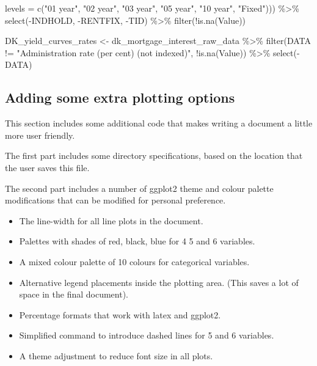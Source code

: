 \documentclass[
]{book}
\newenvironment{Shaded}{\begin{snugshade}}{\end{snugshade}}
\newcommand{\AttributeTok}[1]{\textcolor[rgb]{0.77,0.63,0.00}{#1}}
\newcommand{\FunctionTok}[1]{\textcolor[rgb]{0.00,0.00,0.00}{#1}}
\newcommand{\NormalTok}[1]{#1}
\newcommand{\OtherTok}[1]{\textcolor[rgb]{0.56,0.35,0.01}{#1}}
\newcommand{\SpecialCharTok}[1]{\textcolor[rgb]{0.00,0.00,0.00}{#1}}
\newcommand{\StringTok}[1]{\textcolor[rgb]{0.31,0.60,0.02}{#1}}
\providecommand{\tightlist}{%
  \setlength{\itemsep}{0pt}\setlength{\parskip}{0pt}}
\begin{document}
\begin{Shaded}
\begin{Highlighting}[]
                                      \AttributeTok{levels =} \FunctionTok{c}\NormalTok{(}\StringTok{"01 year"}\NormalTok{,}
                                                 \StringTok{"02 year"}\NormalTok{,}
                                                 \StringTok{"03 year"}\NormalTok{, }
                                                 \StringTok{"05 year"}\NormalTok{,}
                                                 \StringTok{"10 year"}\NormalTok{,}
                                                 \StringTok{"Fixed"}\NormalTok{))) }\SpecialCharTok{\%\textgreater{}\%}
    \FunctionTok{select}\NormalTok{(}\SpecialCharTok{{-}}\NormalTok{INDHOLD, }\SpecialCharTok{{-}}\NormalTok{RENTFIX, }\SpecialCharTok{{-}}\NormalTok{TID) }\SpecialCharTok{\%\textgreater{}\%}
    \FunctionTok{filter}\NormalTok{(}\SpecialCharTok{!}\FunctionTok{is.na}\NormalTok{(Value))}


\NormalTok{DK\_yield\_curves\_rates }\OtherTok{\textless{}{-}}\NormalTok{ dk\_mortgage\_interest\_raw\_data }\SpecialCharTok{\%\textgreater{}\%}
    \FunctionTok{filter}\NormalTok{(DATA }\SpecialCharTok{!=} \StringTok{"Administration rate (per cent) (not indexed)"}\NormalTok{,}
           \SpecialCharTok{!}\FunctionTok{is.na}\NormalTok{(Value)) }\SpecialCharTok{\%\textgreater{}\%}
    \FunctionTok{select}\NormalTok{(}\SpecialCharTok{{-}}\NormalTok{DATA)}
\end{Highlighting}
\end{Shaded}

\hypertarget{adding-some-extra-plotting-options}{%
\subsection{Adding some extra plotting options}\label{adding-some-extra-plotting-options}}

This section includes some additional code that makes writing a document a little more user friendly.

The first part includes some directory specifications, based on the
location that the user saves this file.

The second part includes a number of ggplot2 theme and colour palette
modifications that can be modified for personal preference.

\begin{itemize}
\tightlist
\item
  The line-width for all line plots in the document.
\item
  Palettes with shades of red, black, blue for 4 5 and 6 variables.
\item
  A mixed colour palette of 10 colours for categorical variables.
\item
  Alternative legend placements inside the plotting area.
  (This saves a lot of space in the final document).
\item
  Percentage formats that work with latex and ggplot2.
\item
  Simplified command to introduce dashed lines for 5 and 6 variables.
\item
  A theme adjustment to reduce font size in all plots.
\end{itemize}
\end{document}
